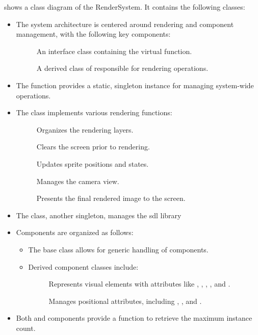 \documentclass{projdoc}
\begin{document}
 shows a class diagram of the RenderSystem. It contains the
following classes:\noparbreak
\begin{itemize}
	\item The system architecture is centered around rendering and component
		management, with the following key components:\noparbreak
		\begin{description}
			\item[] An interface class containing the virtual
				 function.
			\item[] A derived class of 
				responsible for rendering operations.
		\end{description}
	\item The  function provides a static, singleton
		instance for managing system-wide operations.
	\item The  class implements various rendering
		functions:\noparbreak
		\begin{description}
			\item[] Organizes the rendering layers.
			\item[] Clears the screen prior to rendering.
			\item[] Updates sprite positions and states.
			\item[] Manages the camera view.
			\item[] Presents the final rendered image to the
				screen.
		\end{description}
	\item The  class, another singleton, manages the \gls{sdl}
		library
	\item Components are organized as follows:\noparbreak
		\begin{itemize}
			\item The  base class allows for generic handling of
				components.
			\item Derived component classes include:\noparbreak
				\begin{description}
					\item[] Represents visual elements with attributes like
						, , ,
						, and .
					\item[] Manages positional attributes, including
						, , and .
				\end{description}
		\end{itemize}
	\item Both  and  components provide a
		 function to retrieve the maximum instance count.
\end{itemize}
\end{document}

